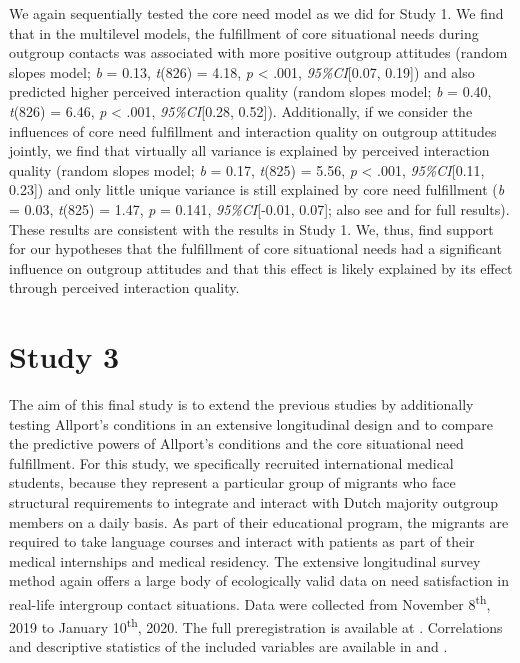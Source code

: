 We again sequentially tested the core need model as we did for Study 1.
We find that in the multilevel models, the fulfillment of core
situational needs during outgroup contacts was associated with more
positive outgroup attitudes (random slopes model; \textit{b} = 0.13,
\textit{t}(826) = 4.18, \textit{p} \textless{} .001,
\textit{95\%CI}{[}0.07, 0.19{]}) and also predicted higher perceived
interaction quality (random slopes model; \textit{b} = 0.40,
\textit{t}(826) = 6.46, \textit{p} \textless{} .001,
\textit{95\%CI}{[}0.28, 0.52{]}). Additionally, if we consider the
influences of core need fulfillment and interaction quality on outgroup
attitudes jointly, we find that virtually all variance is explained by
perceived interaction quality (random slopes model; \textit{b} = 0.17,
\textit{t}(825) = 5.56, \textit{p} \textless{} .001,
\textit{95\%CI}{[}0.11, 0.23{]}) and only little unique variance is
still explained by core need fulfillment (\textit{b} = 0.03,
\textit{t}(825) = 1.47, \textit{p} = 0.141, \textit{95\%CI}{[}-0.01,
0.07{]}; also see  and
 for full results). These results are
consistent with the results in Study 1. We, thus, find support for our
hypotheses that the fulfillment of core situational needs had a
significant influence on outgroup attitudes and that this effect is
likely explained by its effect through perceived interaction quality.

\section{Study 3}

The aim of this final study is to extend the previous studies by
additionally testing Allport's conditions in an extensive longitudinal
design and to compare the predictive powers of Allport's conditions and
the core situational need fulfillment. For this study, we specifically
recruited international medical students, because they represent a
particular group of migrants who face structural requirements to
integrate and interact with Dutch majority outgroup members on a daily
basis. As part of their educational program, the migrants are required
to take language courses and interact with patients as part of their
medical internships and medical residency. The extensive longitudinal
survey method again offers a large body of ecologically valid data on
need satisfaction in real-life intergroup contact situations. Data were
collected from November 8\textsuperscript{th}, 2019 to January
10\textsuperscript{th}, 2020. The full preregistration is available at
\citet[][]{KreienkampMasked2021f}. Correlations and descriptive
statistics of the included variables are available in
 and .


